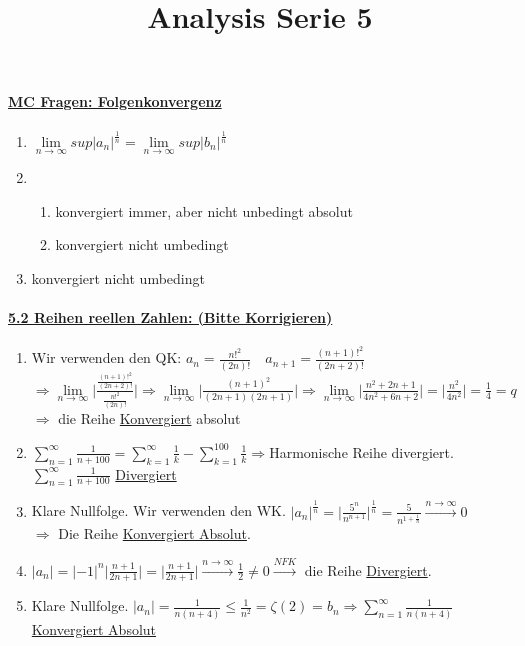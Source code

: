 \documentclass[8pt]{extreport}
\title{Analysis Serie 5}
\begin{document}
\paragraph{\underline{ MC Fragen: Folgenkonvergenz}}
\begin{enumerate}[label = (\alph*)]
\item $\lim\limits_{n \to \infty} sup |a_n|^{\frac{1}{n}} = \lim\limits_{n \to \infty} sup |b_n|^{\frac{1}{n}}$
\item
\begin{enumerate}[label =(\Alph*)]
\item konvergiert immer, aber nicht unbedingt absolut
\item konvergiert nicht umbedingt
\end{enumerate}
\item konvergiert nicht umbedingt
\end{enumerate}
\paragraph{\underline{5.2 Reihen reellen Zahlen: (Bitte Korrigieren)}}
\begin{enumerate}[label = (\alph*)]
\item Wir verwenden den QK: $a_n = \frac{{n!}^2}{(2n)!} \quad  a_{n+1} = \frac{(n+1)!^2}{(2n+2)!}$\\
$\Rightarrow \lim\limits_{n \to \infty} \Bigg| \frac{ \frac{(n+1)!^2}{(2n+2)!}}{ \frac{{n!}^2}{(2n)!}}\Bigg| \Rightarrow \lim\limits_{n \to \infty}\bigg|\frac{(n+1)^2}{(2n+1)(2n+1)}\bigg|  \Rightarrow \lim\limits_{n \to \infty}\bigg|\frac{n^2 + 2n + 1}{4n^2 + 6n + 2}\bigg| = \bigg|\frac{n^2}{4n^2}\bigg| = \frac{1}{4} = q$\\ $\Rightarrow$ die Reihe \underline{Konvergiert} absolut
\item $\displaystyle\sum_{n = 1}^{\infty} \frac{1}{n+100} = \displaystyle\sum_{k=1}^{\infty}\frac{1}{k} - \displaystyle\sum_{k=1}^{100}\frac{1}{k} \Rightarrow $Harmonische Reihe divergiert.$\displaystyle\sum_{n = 1}^{\infty} \frac{1}{n+100}$ \underline{Divergiert}
\item Klare Nullfolge. Wir verwenden den WK. $|a_n|^\frac{1}{n} = \bigg|\frac{5^n}{n^{n+1}}\bigg|^\frac{1}{n} = \frac{5}{n^{1+\frac{1}{n}}} \xrightarrow{n \to \infty} 0$\\
$\Rightarrow$ Die Reihe \underline{Konvergiert Absolut}.
\item $|a_n| = |-1|^n\bigg|\frac{n+1}{2n+1}\bigg| = \bigg|\frac{n+1}{2n+1} \bigg| \xrightarrow{n \to \infty} \frac{1}{2} \neq 0 \xrightarrow{NFK}$ die Reihe \underline{Divergiert}.
\item Klare Nullfolge. $|a_n| = \frac{1}{n(n+4)} \leq \frac{1}{n^2} = \zeta(2) = b_n \Rightarrow \displaystyle\sum_{n=1}^{\infty}\frac{1}{n(n+4)}$ \underline{Konvergiert Absolut}
\end{enumerate}
\end{document}
